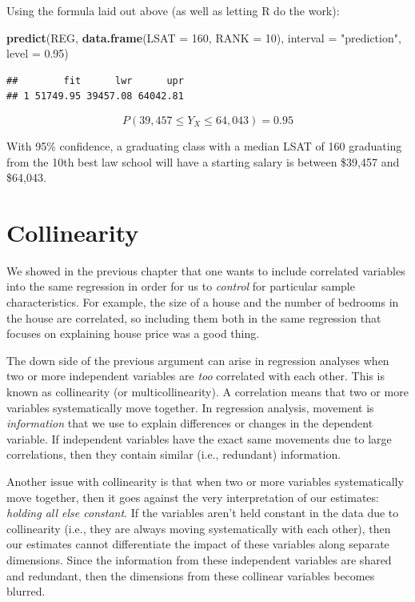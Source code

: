 \documentclass[
]{book}
\newenvironment{Shaded}{\begin{snugshade}}{\end{snugshade}}
\newcommand{\AttributeTok}[1]{\textcolor[rgb]{0.13,0.29,0.53}{#1}}
\newcommand{\DecValTok}[1]{\textcolor[rgb]{0.00,0.00,0.81}{#1}}
\newcommand{\FloatTok}[1]{\textcolor[rgb]{0.00,0.00,0.81}{#1}}
\newcommand{\FunctionTok}[1]{\textcolor[rgb]{0.13,0.29,0.53}{\textbf{#1}}}
\newcommand{\NormalTok}[1]{#1}
\newcommand{\OtherTok}[1]{\textcolor[rgb]{0.56,0.35,0.01}{#1}}
\newcommand{\StringTok}[1]{\textcolor[rgb]{0.31,0.60,0.02}{#1}}
\begin{document}
Using the formula laid out above (as well as letting R do the work):

\begin{Shaded}
\begin{Highlighting}[]
\FunctionTok{predict}\NormalTok{(REG,}
        \FunctionTok{data.frame}\NormalTok{(}\StringTok{\textquotesingle{}LSAT\textquotesingle{}} \OtherTok{=} \DecValTok{160}\NormalTok{, }\StringTok{\textquotesingle{}RANK\textquotesingle{}} \OtherTok{=} \DecValTok{10}\NormalTok{),}
        \AttributeTok{interval =} \StringTok{"prediction"}\NormalTok{, }\AttributeTok{level =} \FloatTok{0.95}\NormalTok{)}
\end{Highlighting}
\end{Shaded}

\begin{verbatim}
##        fit      lwr      upr
## 1 51749.95 39457.08 64042.81
\end{verbatim}

\medskip

\[P \left(39,457 \leq Y_X 
\leq 64,043 \right) = 0.95\]

With 95\% confidence, a graduating class with a median LSAT of 160 graduating from the 10th best law school will have a starting salary is between \$39,457 and \$64,043.

\chapter{Collinearity}\label{COL}

We showed in the previous chapter that one wants to include correlated variables into the same regression in order for us to \emph{control} for particular sample characteristics. For example, the size of a house and the number of bedrooms in the house are correlated, so including them both in the same regression that focuses on explaining house price was a good thing.

The down side of the previous argument can arise in regression analyses when two or more independent variables are \emph{too} correlated with each other. This is known as collinearity (or multicollinearity). A correlation means that two or more variables systematically move together. In regression analysis, movement is \emph{information} that we use to explain differences or changes in the dependent variable. If independent variables have the exact same movements due to large correlations, then they contain similar (i.e., redundant) information.

Another issue with collinearity is that when two or more variables systematically move together, then it goes against the very interpretation of our estimates: \emph{holding all else constant}. If the variables aren't held constant in the data due to collinearity (i.e., they are always moving systematically with each other), then our estimates cannot differentiate the impact of these variables along separate dimensions. Since the information from these independent variables are shared and redundant, then the dimensions from these collinear variables becomes blurred.
\end{document}

